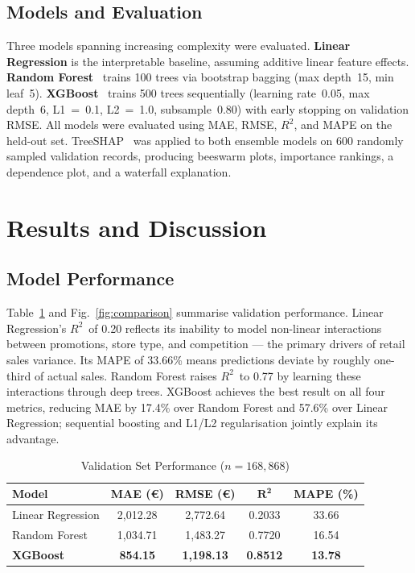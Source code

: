 \documentclass[conference]{IEEEtran}
\begin{document}
\subsection{Models and Evaluation}

Three models spanning increasing complexity were evaluated. \textbf{Linear Regression} is the interpretable baseline, assuming additive linear feature effects. \textbf{Random Forest}~\cite{breiman2001} trains 100 trees via bootstrap bagging (max depth~15, min leaf~5). \textbf{XGBoost}~\cite{chen2016} trains 500 trees sequentially (learning rate~0.05, max depth~6, L1~=~0.1, L2~=~1.0, subsample~0.80) with early stopping on validation RMSE. All models were evaluated using MAE, RMSE, $R^{2}$, and MAPE on the held-out set. TreeSHAP~\cite{lundberg2020} was applied to both ensemble models on 600 randomly sampled validation records, producing beeswarm plots, importance rankings, a dependence plot, and a waterfall explanation.

\section{Results and Discussion}
\label{sec:results}

\subsection{Model Performance}

Table~\ref{tab:performance} and Fig.~\ref{fig:comparison} summarise validation performance. Linear Regression's $R^{2}$~of 0.20 reflects its inability to model non-linear interactions between promotions, store type, and competition — the primary drivers of retail sales variance. Its MAPE of 33.66\% means predictions deviate by roughly one-third of actual sales. Random Forest raises $R^{2}$~to 0.77 by learning these interactions through deep trees. XGBoost achieves the best result on all four metrics, reducing MAE by 17.4\% over Random Forest and 57.6\% over Linear Regression; sequential boosting and L1/L2 regularisation jointly explain its advantage.

\begin{table}[t]
\centering
\caption{Validation Set Performance ($n = 168{,}868$)}
\label{tab:performance}
\setlength{\tabcolsep}{4pt}
\begin{tabular}{lcccc}
\toprule
\textbf{Model} & \textbf{MAE (\euro)} & \textbf{RMSE (\euro)} & $\boldsymbol{R^{2}}$ & \textbf{MAPE (\%)} \\
\midrule
Linear Regression & 2,012.28 & 2,772.64 & 0.2033 & 33.66 \\
Random Forest     & 1,034.71 & 1,483.27 & 0.7720 & 16.54 \\
\textbf{XGBoost}  & \textbf{854.15} & \textbf{1,198.13} & \textbf{0.8512} & \textbf{13.78} \\
\bottomrule
\end{tabular}
\end{table}
\end{document}
